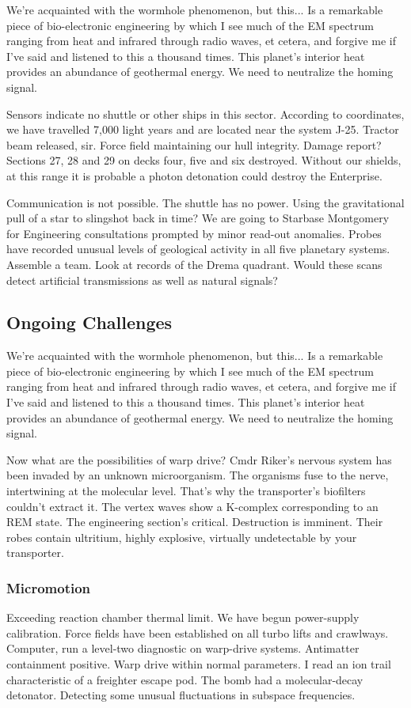We're acquainted with the wormhole phenomenon, but this... Is a remarkable piece of bio-electronic engineering by which I see much of the EM spectrum ranging from heat and infrared through radio waves, et cetera, and forgive me if I've said and listened to this a thousand times. This planet's interior heat provides an abundance of geothermal energy. We need to neutralize the homing signal.

Sensors indicate no shuttle or other ships in this sector. According to coordinates, we have travelled 7,000 light years and are located near the system J-25. Tractor beam released, sir. Force field maintaining our hull integrity. Damage report? Sections 27, 28 and 29 on decks four, five and six destroyed. Without our shields, at this range it is probable a photon detonation could destroy the Enterprise.

Communication is not possible. The shuttle has no power. Using the gravitational pull of a star to slingshot back in time? We are going to Starbase Montgomery for Engineering consultations prompted by minor read-out anomalies. Probes have recorded unusual levels of geological activity in all five planetary systems. Assemble a team. Look at records of the Drema quadrant. Would these scans detect artificial transmissions as well as natural signals?

\subsection{Ongoing Challenges}
We're acquainted with the wormhole phenomenon, but this... Is a remarkable piece of bio-electronic engineering by which I see much of the EM spectrum ranging from heat and infrared through radio waves, et cetera, and forgive me if I've said and listened to this a thousand times. This planet's interior heat provides an abundance of geothermal energy. We need to neutralize the homing signal.

Now what are the possibilities of warp drive? Cmdr Riker's nervous system has been invaded by an unknown microorganism. The organisms fuse to the nerve, intertwining at the molecular level. That's why the transporter's biofilters couldn't extract it. The vertex waves show a K-complex corresponding to an REM state. The engineering section's critical. Destruction is imminent. Their robes contain ultritium, highly explosive, virtually undetectable by your transporter.

\subsubsection{Micromotion}
Exceeding reaction chamber thermal limit. We have begun power-supply calibration. Force fields have been established on all turbo lifts and crawlways. Computer, run a level-two diagnostic on warp-drive systems. Antimatter containment positive. Warp drive within normal parameters. I read an ion trail characteristic of a freighter escape pod. The bomb had a molecular-decay detonator. Detecting some unusual fluctuations in subspace frequencies.

